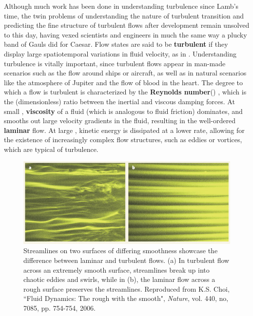 Although much work has been done in understanding turbulence since Lamb's time, the twin problems of understanding the nature of turbulent transition and predicting the fine structure of turbulent flows after development remain unsolved to this day, having vexed scientists and engineers in much the same way a plucky band of Gauls did for Caesar. Flow states are said to be {\bf turbulent} if they display large spatiotemporal variations in fluid velocity, as in . Understanding turbulence is vitally important, since turbulent flows appear in man-made scenarios such as the flow around ships or aircraft, as well as in natural scenarios like the atmosphere of Jupiter  and the flow of blood in the heart. The degree to which a flow is turbulent is characterized by the {\bf Reynolds number}(\ReN) , which is the (dimensionless) ratio between the inertial and viscous damping forces. At small \ReN, {\bf viscosity} of a fluid (which is analogous to fluid friction) dominates, and smooths out large velocity gradients in the fluid, resulting in the well-ordered {\bf laminar} flow. At large \ReN, kinetic energy is dissipated at a lower rate, allowing for the existence of increasingly complex flow structures, such as eddies or vortices, which are typical of turbulence.
\begin{figure}[h]
\centerline{
\includegraphics[width=\textwidth]{Figs/laminarTurbulent}}
\caption{Streamlines on two surfaces of differing smoothness showcase the difference between laminar and turbulent flows. (a) In turbulent flow across an extremely smooth surface, streamlines break up into chaotic eddies and swirls, while in (b), the laminar flow across a rough surface preserves the streamlines. Reproduced from K.S. Choi, ``Fluid Dynamics: The rough with the smooth", \emph{Nature},  vol. 440, no, 7085, pp. 754-754, 2006.}\label{fig:cylinderWake}
\end{figure}
